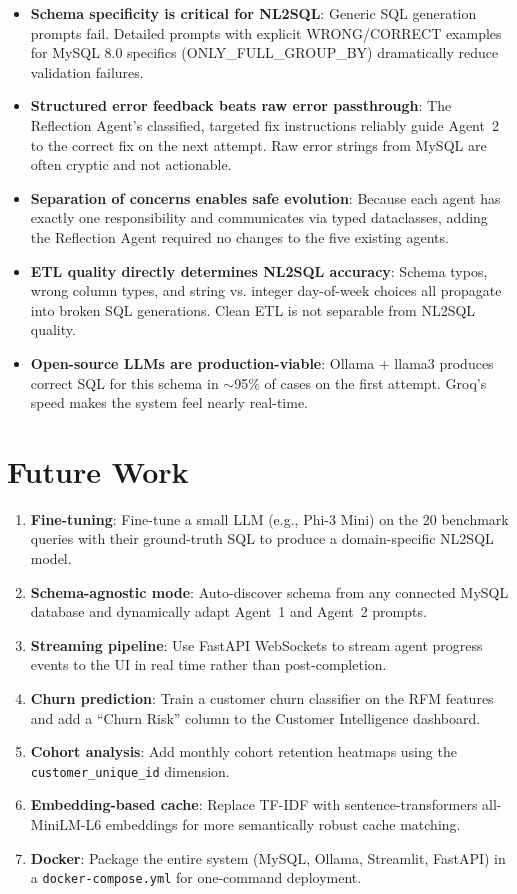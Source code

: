 \documentclass[12pt,a4paper]{report}
\begin{document}
\begin{itemize}
  \item \textbf{Schema specificity is critical for NL2SQL}: Generic SQL generation prompts fail.
        Detailed prompts with explicit WRONG/CORRECT examples for MySQL 8.0 specifics
        (ONLY\_FULL\_GROUP\_BY) dramatically reduce validation failures.
  \item \textbf{Structured error feedback beats raw error passthrough}: The Reflection Agent's
        classified, targeted fix instructions reliably guide Agent~2 to the correct fix on the
        next attempt. Raw error strings from MySQL are often cryptic and not actionable.
  \item \textbf{Separation of concerns enables safe evolution}: Because each agent has exactly
        one responsibility and communicates via typed dataclasses, adding the Reflection Agent
        required no changes to the five existing agents.
  \item \textbf{ETL quality directly determines NL2SQL accuracy}: Schema typos, wrong column
        types, and string vs. integer day-of-week choices all propagate into broken SQL
        generations. Clean ETL is not separable from NL2SQL quality.
  \item \textbf{Open-source LLMs are production-viable}: Ollama + llama3 produces correct SQL
        for this schema in $\sim$95\% of cases on the first attempt. Groq's speed makes the
        system feel nearly real-time.
\end{itemize}

\section{Future Work}

\begin{enumerate}[leftmargin=*]
  \item \textbf{Fine-tuning}: Fine-tune a small LLM (e.g., Phi-3 Mini) on the 20 benchmark
        queries with their ground-truth SQL to produce a domain-specific NL2SQL model.
  \item \textbf{Schema-agnostic mode}: Auto-discover schema from any connected MySQL database
        and dynamically adapt Agent~1 and Agent~2 prompts.
  \item \textbf{Streaming pipeline}: Use FastAPI WebSockets to stream agent progress events
        to the UI in real time rather than post-completion.
  \item \textbf{Churn prediction}: Train a customer churn classifier on the RFM features and
        add a ``Churn Risk'' column to the Customer Intelligence dashboard.
  \item \textbf{Cohort analysis}: Add monthly cohort retention heatmaps using the
        \texttt{customer\_unique\_id} dimension.
  \item \textbf{Embedding-based cache}: Replace TF-IDF with sentence-transformers all-MiniLM-L6
        embeddings for more semantically robust cache matching.
  \item \textbf{Docker}: Package the entire system (MySQL, Ollama, Streamlit, FastAPI) in a
        \texttt{docker-compose.yml} for one-command deployment.
\end{enumerate}
\end{document}
